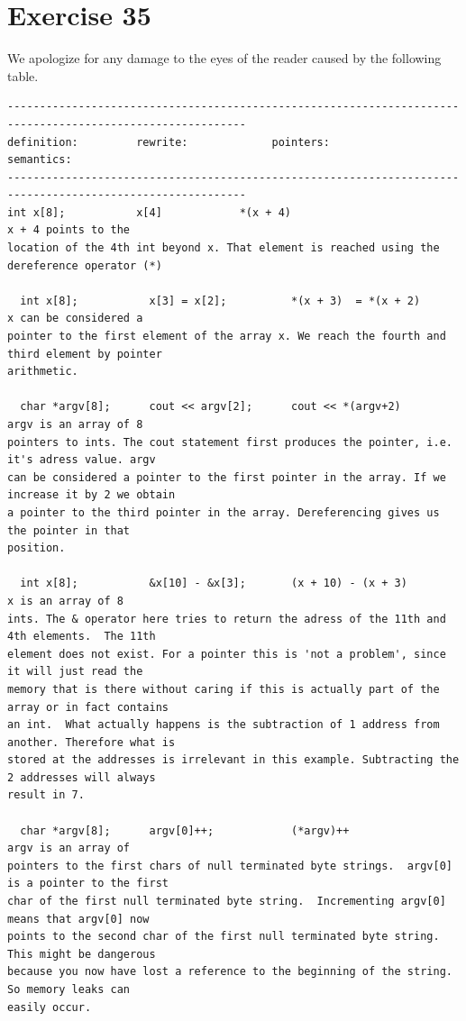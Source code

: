 \documentclass{article}[9pt]
\begin{document}
\section*{Exercise 35}
We apologize for any damage to the eyes of the reader caused by the following table.
\begin{verbatim}
-----------------------------------------------------------------------------------------------------------
definition:         rewrite:             pointers:                    semantics:
-----------------------------------------------------------------------------------------------------------
int x[8];           x[4]            *(x + 4)                          x + 4 points to the
location of the 4th int beyond x. That element is reached using the dereference operator (*)

  int x[8];           x[3] = x[2];          *(x + 3)  = *(x + 2)        x can be considered a
pointer to the first element of the array x. We reach the fourth and third element by pointer
arithmetic.

  char *argv[8];      cout << argv[2];      cout << *(argv+2)           argv is an array of 8
pointers to ints. The cout statement first produces the pointer, i.e. it's adress value. argv
can be considered a pointer to the first pointer in the array. If we increase it by 2 we obtain
a pointer to the third pointer in the array. Dereferencing gives us the pointer in that
position.

  int x[8];           &x[10] - &x[3];       (x + 10) - (x + 3)          x is an array of 8
ints. The & operator here tries to return the adress of the 11th and 4th elements.  The 11th
element does not exist. For a pointer this is 'not a problem', since it will just read the
memory that is there without caring if this is actually part of the array or in fact contains
an int.  What actually happens is the subtraction of 1 address from another. Therefore what is
stored at the addresses is irrelevant in this example. Subtracting the 2 addresses will always
result in 7. 

  char *argv[8];      argv[0]++;            (*argv)++                   argv is an array of
pointers to the first chars of null terminated byte strings.  argv[0] is a pointer to the first
char of the first null terminated byte string.  Incrementing argv[0] means that argv[0] now
points to the second char of the first null terminated byte string. This might be dangerous
because you now have lost a reference to the beginning of the string. So memory leaks can
easily occur.


\end{verbatim}
\end{document}
